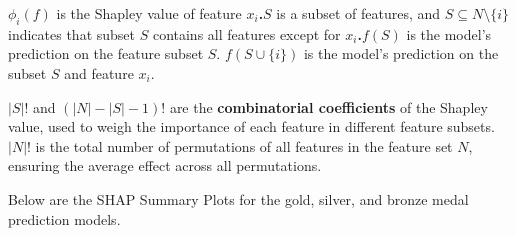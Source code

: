 \documentclass[12pt]{article}  %
\begin{document}
\textbf{\(\phi_i(f)\)} is the Shapley value of feature \textbf{\(x_i\).\(S\)} is a subset of features, and \(S \subseteq N \setminus \{i\}\) indicates that subset \textbf{\(S\)} contains all features except for \textbf{\(x_i\).\(f(S)\)} is the model's prediction on the feature subset \textbf{\(S\)}.
\textbf{\(f(S \cup \{i\})\)} is the model's prediction on the subset \textbf{\(S\)} and feature \textbf{\(x_i\)}.

\textbf{\(|S|!\) }and \textbf{\((|N|-|S|-1)!\)} are the \textbf{combinatorial coefficients} of the Shapley value, used to weigh the importance of each feature in different feature subsets.
\textbf{\(|N|!\)} is the total number of permutations of all features in the feature set \textbf{\(N\)}, ensuring the average effect across all permutations.

Below are the SHAP Summary Plots for the gold, silver, and bronze medal prediction models.
\end{document}
